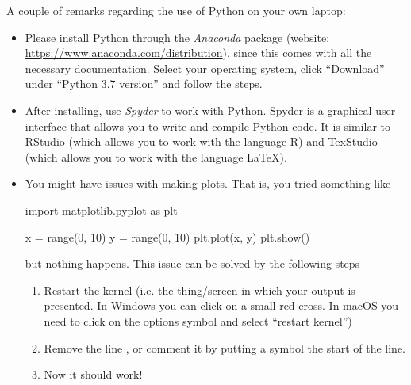 A couple of remarks regarding the use of Python on your own laptop:
\begin{itemize}
\item Please install Python through the \emph{Anaconda} package (website: \url{https://www.anaconda.com/distribution}), since this comes with all the necessary documentation. Select your operating system, click ``Download'' under ``Python 3.7 version'' and follow the steps.
\item After installing, use \emph{Spyder} to work with Python. Spyder is a graphical user interface that allows you to write and compile Python code. It is similar to RStudio (which allows you to work with the language R) and TexStudio (which allows you to work with the language \LaTeX\/).
\item You might have issues with making plots. That is, you tried something like
\begin{pyverbatim}
import matplotlib.pyplot as plt

x = range(0, 10)
y = range(0, 10)
plt.plot(x, y)
plt.show()
\end{pyverbatim}
but nothing happens. This issue can be solved by the following steps
\begin{enumerate}
\item Restart the kernel (i.e. the thing/screen in which your output is presented. In Windows you can click on a small red cross. In macOS you need to click on the options symbol and select ``restart kernel'')
\item Remove the line , or comment it by putting a \pyv{#} symbol the start of the line.
\item Now it should work!
\end{enumerate}
\end{itemize}
